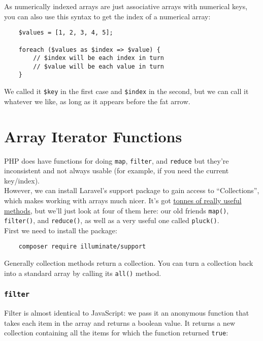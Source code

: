 As numerically indexed arrays are just associative arrays with numerical keys, you can also use this syntax to get the index of a numerical array:

\begin{verbatim}
    $values = [1, 2, 3, 4, 5];

    foreach ($values as $index => $value) {
        // $index will be each index in turn
        // $value will be each value in turn
    }
\end{verbatim}

We called it \texttt{\$key} in the first case and \texttt{\$index} in the second, but we can call it whatever we like, as long as it appears before the fat arrow.


\section{Array Iterator Functions}

PHP does have functions for doing \texttt{map}, \texttt{filter}, and \texttt{reduce} but they're inconsistent and not always usable (for example, if you need the current key/index).
\\

However, we can install Laravel's support package to gain access to ``Collections'', which makes working with arrays much nicer. It's got \href{http://laravel.com/docs/master/collections#available-methods}{tonnes of really useful methods}, but we'll just look at four of them here: our old friends \texttt{map()}, \texttt{filter()}, and \texttt{reduce()}, as well as a very useful one called \texttt{pluck()}.
\\

First we need to install the package:

\begin{verbatim}
    composer require illuminate/support
\end{verbatim}

Generally collection methods return a collection. You can turn a collection back into a standard array by calling its \texttt{all()} method.

\pagebreak

\subsubsection{\texttt{filter}}

Filter is almost identical to JavaScript: we pass it an anonymous function that takes each item in the array and returns a boolean value. It returns a new collection containing all the items for which the function returned \texttt{true}:

